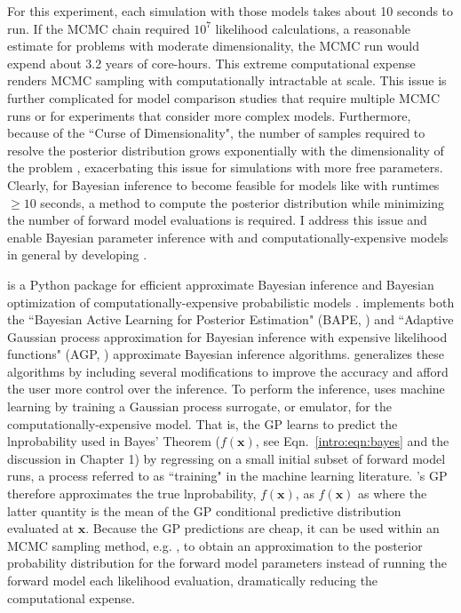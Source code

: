 For this experiment, each \vplanet simulation with those models takes about 10 seconds to run. If the MCMC chain required  $10^7$ likelihood calculations, a reasonable estimate for problems with moderate dimensionality, the MCMC run would expend about 3.2 years of core-hours. This extreme computational expense renders MCMC sampling with \vplanet computationally intractable at scale. This issue is further complicated for model comparison studies that require multiple MCMC runs or for experiments that consider more complex models. Furthermore, because of the ``Curse of Dimensionality", the number of samples required to resolve the posterior distribution grows exponentially with the dimensionality of the problem \citep{Bellman1957}, exacerbating this issue for simulations with more free parameters. Clearly, for Bayesian inference to become feasible for models like \vplanet with runtimes $\geq 10$ seconds, a method to compute the posterior distribution while minimizing the number of forward model evaluations is required. I address this issue and enable Bayesian parameter inference with \vplanet and computationally-expensive models in general by developing \approxposterior \citep{FlemingVanderPlas2018}.

\approxposterior is a Python package for efficient approximate Bayesian inference and Bayesian optimization of computationally-expensive probabilistic models \citep{FlemingVanderPlas2018}. \approxposterior implements both the ``Bayesian Active Learning for Posterior Estimation" (BAPE, \citet{Kandasamy2017}) and ``Adaptive Gaussian process approximation for Bayesian inference with expensive likelihood functions" (AGP, \citet{Wang2018}) approximate Bayesian inference algorithms. \approxposterior generalizes these algorithms by including several modifications to improve the accuracy and afford the user more control over the inference. To perform the inference, \approxposterior uses machine learning by training a Gaussian process \citep[GP,][]{Rasmussen2006} surrogate, or emulator, for the computationally-expensive model. That is, the GP learns to predict the lnprobability used in Bayes' Theorem ($f(\textbf{x})$, see Eqn.~\ref{intro:eqn:bayes} and the discussion in Chapter 1) by regressing on a small initial subset of forward model runs, a process referred to as ``training" in the machine learning literature. \approxposterior's GP therefore approximates the true lnprobability, $f(\textbf{x})$, as $\hat{f}(\textbf{x})$ as where the latter quantity is the mean of the GP conditional predictive distribution evaluated at $\textbf{x}$. Because the GP predictions are cheap, it can be used within an MCMC sampling method, e.g. \emcee, to obtain an approximation to the posterior probability distribution for the forward model parameters instead of running the forward model each likelihood evaluation, dramatically reducing the computational expense. 

